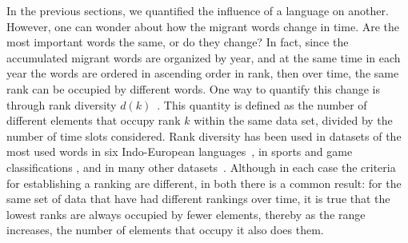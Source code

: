 \documentclass[10pt,letterpaper]{article} %
\begin{document}
In the previous sections, we quantified the influence of a language on another. However, 
one can wonder about how the migrant words change in time. Are the most important words
the same, or do they change? In fact, 
since the accumulated migrant words are organized by year, and at the same time
in each year the words are ordered in ascending order in rank, then over time,
the same rank can be occupied by different words. One way to quantify
this change is through rank diversity $d(k)$~\cite{iplosone}. This quantity is
defined as the number 
of different elements that occupy rank  $k$ within the same data set, divided
by the number of time slots considered.
Rank diversity has been used in datasets of the most used words in six
Indo-European languages~\cite{iplosone}, in sports and game classifications \cite{Morales_epj}, 
and in many other datasets~\cite{Iniguez2022}. 
Although in
each case the criteria for establishing a ranking are different, in both there
is a common result: for the same set of data that have had different rankings
over time, it is true that the lowest ranks are always occupied by fewer
elements, thereby as the range increases, the number of elements that occupy it
also does them.
\end{document}
